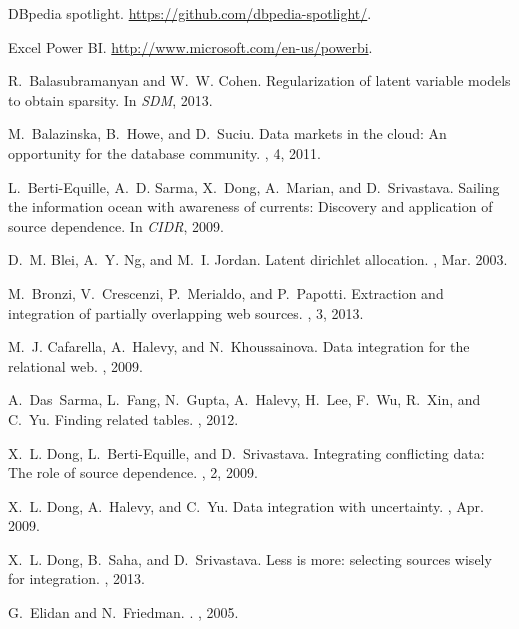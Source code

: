 \documentclass{sig-alternate}
\begin{document}
{\small
\begin{thebibliography}{10}
\vspace{2pt}
DBpedia spotlight.
\newblock \url{https://github.com/dbpedia-spotlight/}.

Excel Power BI.
\newblock \url{http://www.microsoft.com/en-us/powerbi}.

R.~Balasubramanyan and W.~W. Cohen.
\newblock Regularization of latent variable models to obtain sparsity.
\newblock In {\em SDM}, 2013.

M.~Balazinska, B.~Howe, and D.~Suciu.
\newblock Data markets in the cloud: An opportunity for the database community.
, 4, 2011.

L.~Berti-Equille, A.~D. Sarma, X.~Dong, A.~Marian, and D.~Srivastava.
\newblock Sailing the information ocean with awareness of currents: Discovery
  and application of source dependence.
\newblock In {\em CIDR}, 2009.

D.~M. Blei, A.~Y. Ng, and M.~I. Jordan.
\newblock Latent dirichlet allocation.
, Mar. 2003.

M.~Bronzi, V.~Crescenzi, P.~Merialdo, and P.~Papotti.
\newblock Extraction and integration of partially overlapping web sources.
, 3, 2013.

M.~J. Cafarella, A.~Halevy, and N.~Khoussainova.
\newblock Data integration for the relational web.
, 2009.

A.~Das~Sarma, L.~Fang, N.~Gupta, A.~Halevy, H.~Lee, F.~Wu, R.~Xin, and C.~Yu.
\newblock Finding related tables.
, 2012.

X.~L. Dong, L.~Berti-Equille, and D.~Srivastava.
\newblock Integrating conflicting data: The role of source dependence.
, 2, 2009.

X.~L. Dong, A.~Halevy, and C.~Yu.
\newblock Data integration with uncertainty.
, Apr. 2009.

X.~L. Dong, B.~Saha, and D.~Srivastava.
\newblock Less is more: selecting sources wisely for integration.
, 2013.

G.~Elidan and N.~Friedman.
.
, 2005.


\end{thebibliography}}
\end{document}
